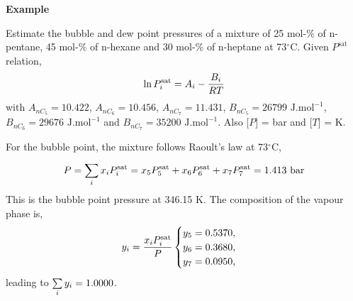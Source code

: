   \medskip
   \begin{MyExample}{\begin{center}{\bf Example}\end{center}}
     \begin{example}\label{Chapter:VLE:Example4}
       Estimate the bubble and dew point pressures of a mixture of 25 mol-$\%$ of n-pentane, 45 mol-$\%$ of n-hexane and 30 mol-$\%$ of n-heptane at 73$^{\circ}$C. Given $P^{\text{sat}}$ relation,
    \begin{displaymath}
      \ln{P_{i}^{\text{sat}}} = A_{i} - \frc{B_{i}}{RT}
    \end{displaymath}
    with $A_{nC_{5}}=10.422$, $A_{nC_{6}}=10.456$, $A_{nC_{7}}=11.431$, $B_{nC_{5}}=26799 \text{ J.mol}^{-1}$, $B_{nC_{6}}=29676 \text{ J.mol}^{-1}$ and $B_{nC_{7}}=35200 \text{ J.mol}^{-1}$. Also [$P$] = bar and [$T$] = K.
     \end{example}

     For the bubble point, the mixture follows Raoult's law at 73$^{\circ}$C,
      \begin{displaymath}
          P = \summation[x_{i}P_{i}^{\text{sat}}]{i}{} = x_{5}P_{5}^{\text{sat}} + x_{6}P_{6}^{\text{sat}} + x_{7}P_{7}^{\text{sat}} = 1.413\text{ bar}
      \end{displaymath}
      This is the bubble point pressure at 346.15 K. The composition of the vapour phase is,
      \begin{displaymath}
             y_{i}=\frc{x_{i}P_{i}^{\text{sat}}}{P}
             \begin{cases}
                  y_{5} = 0.5370,\\
                  y_{6} = 0.3680,\\
                  y_{7} = 0.0950,
             \end{cases}
      \end{displaymath}
      leading to $\summation[y_{i}]{i}{} = 1.0000$.

\medskip


\end{MyExample}
